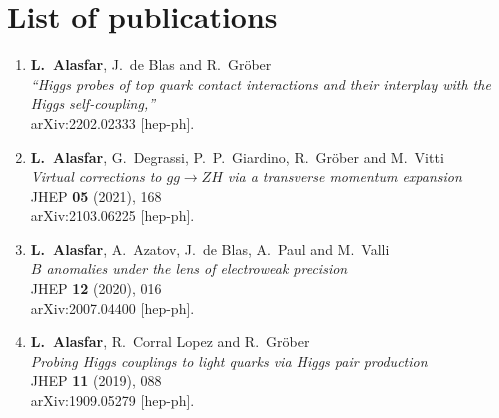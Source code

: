 
\chapter*{List of publications}
\begin{enumerate}
	\item \textbf{L.~Alasfar}, J.~de Blas and R.~Gr\"ober\\
	\textit{``Higgs probes of top quark contact interactions and their interplay with the Higgs self-coupling,''} \\
	arXiv:2202.02333 [hep-ph].
 \item \textbf{L.~Alasfar}, G.~Degrassi, P.~P.~Giardino, R.~Gr\"ober and M.~Vitti\\
 \textit{Virtual corrections to $gg\to ZH$ via a transverse momentum expansion}\\
 JHEP \textbf{05} (2021), 168\\ arXiv:2103.06225 [hep-ph].
\item \textbf{L.~Alasfar}, A.~Azatov, J.~de Blas, A.~Paul and M.~Valli\\
\textit{$B$ anomalies under the lens of electroweak precision}\\
JHEP \textbf{12} (2020), 016\\
arXiv:2007.04400 [hep-ph].
\item \textbf{L.~Alasfar}, R.~Corral Lopez and R.~Gr\"ober\\
\textit{Probing Higgs couplings to light quarks via Higgs pair production}\\
JHEP \textbf{11} (2019), 088\\
arXiv:1909.05279 [hep-ph].
\end{enumerate}%

%

